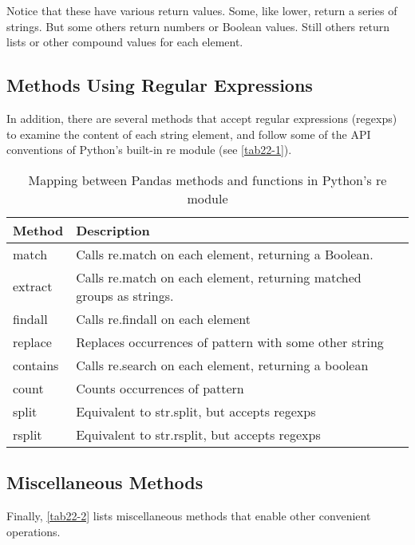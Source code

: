 Notice that these have various return values. Some, like lower, return a series of
strings. But some others return numbers or Boolean values. Still others return lists or other compound values for each element.

\subsection*{Methods Using Regular Expressions}
In addition, there are several methods that accept regular expressions (regexps) to
examine the content of each string element, and follow some of the API conventions
of Python's built-in re module (see \autoref{tab22-1}).

\begin{table}
    \centering
    \caption{Mapping between Pandas methods and functions in Python's re module}
    \label{tab22-1}
    \begin{tabular}{ll}
        \hline
        Method   & Description                                                          \\
        \hline
        match    & Calls re.match on each element, returning a Boolean.                 \\
        extract  & Calls re.match on each element, returning matched groups as strings. \\
        findall  & Calls re.findall on each element                                     \\
        replace  & Replaces occurrences of pattern with some other string               \\
        contains & Calls re.search on each element, returning a boolean                 \\
        count    & Counts occurrences of pattern                                        \\
        split    & Equivalent to str.split, but accepts regexps                         \\
        rsplit   & Equivalent to str.rsplit, but accepts regexps                        \\
        \hline
    \end{tabular}
\end{table}

\subsection*{Miscellaneous Methods}
Finally, \autoref{tab22-2} lists miscellaneous methods that enable other convenient
operations.

